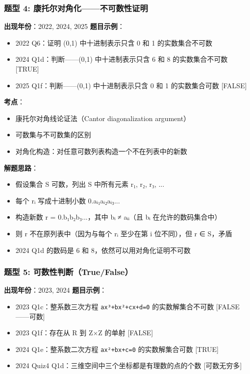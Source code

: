 \documentclass[10pt,a4paper,openany]{ctexbook}
\theoremstyle{definition}
\theoremstyle{remark}
\begin{document}
\vspace{-2pt}

\subsubsection{题型 4: 康托尔对角化——不可数性证明}

\textbf{出现年份}：2022, 2024, 2025
\textbf{题目示例}：
\begin{itemize}
\item 2022 Q6：证明 (0,1) 中十进制表示只含 0 和 1 的实数集合不可数
\item 2024 Q1d：判断——(0,1) 中十进制表示只含 6 和 8 的实数集合不可数 [TRUE]
\item 2025 Q1f：判断——(0,1) 中十进制表示只含 0 和 1 的实数集合可数 [FALSE]

\end{itemize}

\textbf{考点}：
\begin{itemize}
\item 康托尔对角线论证法（Cantor diagonalization argument）
\item 可数集与不可数集的区别
\item 对角化构造：对任意可数列表构造一个不在列表中的新数

\end{itemize}

\textbf{解题思路}：
\begin{itemize}
\item 假设集合 S 可数，列出 S 中所有元素 r₁, r₂, r₃, ...
\item 每个 rᵢ 写成十进制小数 0.aᵢ₁aᵢ₂aᵢ₃...
\item 构造新数 r = 0.b₁b₂b₃...，其中 bᵢ ≠ aᵢᵢ（且 bᵢ 在允许的数码集合中）
\item 则 r 不在原列表中（因为与每个 rᵢ 至少在第 i 位不同），但 r ∈ S，矛盾
\item 2024 Q1d 的数码是 6 和 8，依然可以用对角化证明不可数

\end{itemize}

\vspace{-2pt}

\subsubsection{题型 5: 可数性判断（True/False）}

\textbf{出现年份}：2023, 2024
\textbf{题目示例}：
\begin{itemize}
\item 2023 Q1c：整系数三次方程 \texttt{ax³+bx²+cx+d=0} 的实数解集合不可数 [FALSE——可数]
\item 2023 Q1f：存在从 R 到 Z×Z 的单射 [FALSE]
\item 2024 Q1e：整系数二次方程 \texttt{ax²+bx+c=0} 的实数解集合可数 [TRUE]
\item 2024 Quiz4 Q1d：三维空间中三个坐标都是有理数的点的个数 [可数无穷多]

\end{itemize}
\end{document}
